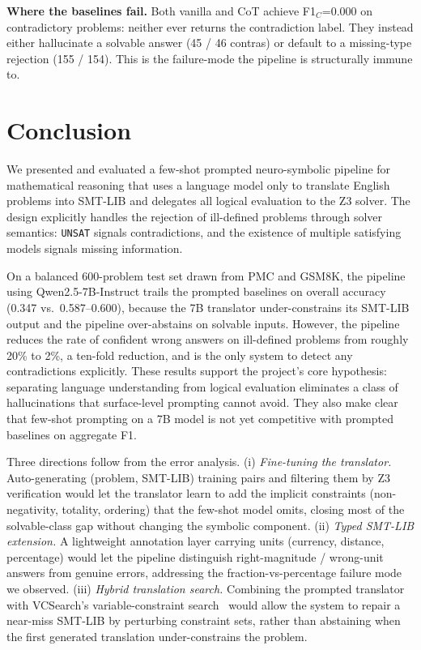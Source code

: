 \documentclass[sigconf, nonacm, onecolumn]{acmart}
\begin{document}
\textbf{Where the baselines fail.} Both vanilla and CoT achieve
F1$_C$=0.000 on contradictory problems: neither ever returns the
contradiction label. They instead either hallucinate a solvable answer
(45 / 46 contras) or default to a missing-type rejection (155 / 154).
This is the failure-mode the pipeline is structurally immune to.

\section{Conclusion}

We presented and evaluated a few-shot prompted neuro-symbolic pipeline
for mathematical reasoning that uses a language model only to translate
English problems into SMT-LIB and delegates all logical evaluation to the
Z3 solver. The design explicitly handles the rejection of ill-defined
problems through solver semantics: \texttt{UNSAT} signals contradictions,
and the existence of multiple satisfying models signals missing
information.

On a balanced 600-problem test set drawn from PMC and GSM8K, the pipeline
using Qwen2.5-7B-Instruct trails the prompted baselines on overall
accuracy (0.347 vs.\ 0.587--0.600), because the 7B translator
under-constrains its SMT-LIB output and the pipeline over-abstains on
solvable inputs. However, the pipeline reduces the rate of confident
wrong answers on ill-defined problems from roughly 20\% to 2\%, a
ten-fold reduction, and is the only system to detect any contradictions
explicitly. These results support the project's core hypothesis:
separating language understanding from logical evaluation eliminates a
class of hallucinations that surface-level prompting cannot avoid. They
also make clear that few-shot prompting on a 7B model is not yet
competitive with prompted baselines on aggregate F1.

Three directions follow from the error analysis. (i) \emph{Fine-tuning
the translator.} Auto-generating (problem, SMT-LIB) training pairs and
filtering them by Z3 verification would let the translator learn to add
the implicit constraints (non-negativity, totality, ordering) that the
few-shot model omits, closing most of the solvable-class gap without
changing the symbolic component. (ii) \emph{Typed SMT-LIB extension.} A
lightweight annotation layer carrying units (currency, distance,
percentage) would let the pipeline distinguish right-magnitude /
wrong-unit answers from genuine errors, addressing the
fraction-vs-percentage failure mode we observed. (iii) \emph{Hybrid
translation search.} Combining the prompted translator with VCSearch's
variable-constraint search~\cite{zhou2024} would allow the system to
repair a near-miss SMT-LIB by perturbing constraint sets, rather than
abstaining when the first generated translation under-constrains the
problem.
\end{document}
